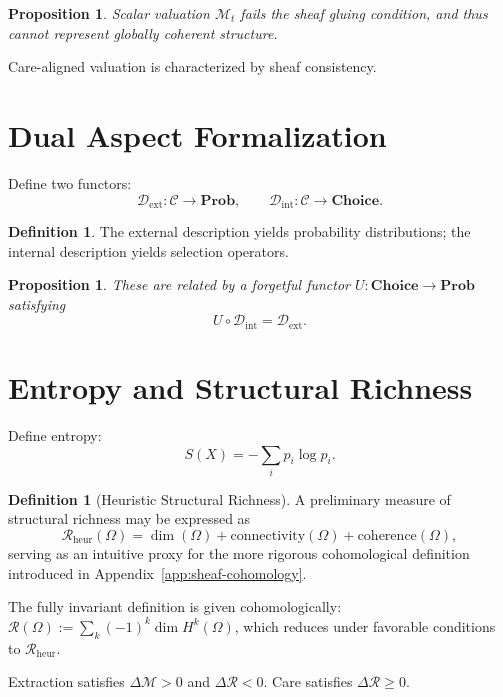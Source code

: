 \documentclass[11pt,a4paper]{article}
\newtheorem{proposition}[theorem]{Proposition}
\theoremstyle{definition}
\newtheorem{definition}[theorem]{Definition}
\theoremstyle{remark}
\begin{document}
\begin{proposition}
Scalar valuation $\mathcal{M}_t$ fails the sheaf gluing condition, and thus cannot represent globally coherent structure.
\end{proposition}

Care-aligned valuation is characterized by sheaf consistency.

\section{Dual Aspect Formalization}

Define two functors:
\[
\mathcal{D}_{\mathrm{ext}} : \mathcal{C} \to \mathbf{Prob}, \qquad \mathcal{D}_{\mathrm{int}} : \mathcal{C} \to \mathbf{Choice}.
\]

\begin{definition}
The external description yields probability distributions; the internal description yields selection operators.
\end{definition}

\begin{proposition}
These are related by a forgetful functor $U : \mathbf{Choice} \to \mathbf{Prob}$ satisfying
\[
U \circ \mathcal{D}_{\mathrm{int}} = \mathcal{D}_{\mathrm{ext}}.
\]
\end{proposition}

\section{Entropy and Structural Richness}

Define entropy:
\[
S(X) = -\sum_i p_i \log p_i.
\]

\begin{definition}[Heuristic Structural Richness]
A preliminary measure of structural richness may be expressed as
\[
\mathcal{R}_{\mathrm{heur}}(\Omega) = \dim(\Omega) + \mathrm{connectivity}(\Omega) + \mathrm{coherence}(\Omega),
\]
serving as an intuitive proxy for the more rigorous cohomological definition introduced in Appendix~\ref{app:sheaf-cohomology}.
\end{definition}

The fully invariant definition is given cohomologically: $\mathcal{R}(\Omega) := \sum_k (-1)^k \dim H^k(\Omega)$, which reduces under favorable conditions to $\mathcal{R}_{\mathrm{heur}}$.

Extraction satisfies $\Delta \mathcal{M} > 0$ and $\Delta \mathcal{R} < 0$. Care satisfies $\Delta \mathcal{R} \geq 0$.
\end{document}
